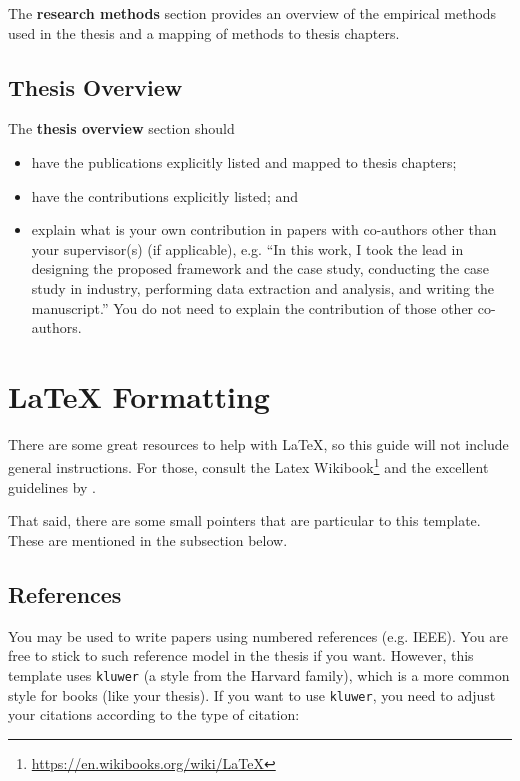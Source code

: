The \textbf{research methods} section provides an overview
of the empirical methods used in the thesis and a mapping of methods
to thesis chapters.

\subsection{Thesis Overview}
\label{sec:c1:overview}

The \textbf{thesis overview} section should
\begin{itemize}
    \item have the publications explicitly listed and mapped to thesis chapters;
    \item have the contributions explicitly listed; and
    \item explain what is your own contribution in papers with co-authors
    other than your supervisor(s) (if applicable), e.g. ``In this work,
    I took the lead in designing the proposed framework and the case study,
    conducting the case study in industry,
    performing data extraction and analysis, and writing the manuscript.''
    You do not need to explain the contribution of those other co-authors.
\end{itemize}

%
%
%

\section{\LaTeX{} Formatting}
\label{sec:c1:latex}

There are some great resources to help with \LaTeX,
so this guide will not include general instructions.
For those, consult the Latex Wikibook\footnote{\url{https://en.wikibooks.org/wiki/LaTeX}}
and the excellent guidelines by \cite{spinellis:latexadvice}.

That said, there are some small pointers that are particular to this template.
These are mentioned in the subsection below.

\subsection{References}
\label{sec:c1:References}

You may be used to write papers using numbered references (e.g. IEEE).
You are free to stick to such reference model in the thesis if you want.
However, this template uses \texttt{kluwer} (a style from the Harvard family),
which is a more common style for books (like your thesis).
If you want to use \texttt{kluwer}, you need to adjust your citations
according to the type of citation:

